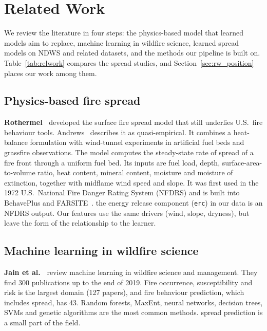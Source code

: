 
\section{Related Work}
\label{sec:related}

We review the literature in four steps: the physics-based model that learned models aim to replace,
machine learning in wildfire science, learned spread models on NDWS and related datasets, and the methods
our pipeline is built on. Table~\ref{tab:relwork} compares the spread studies, and
Section~\ref{sec:rw_position} places our work among them.

\subsection{Physics-based fire spread}

\textbf{Rothermel~\cite{rothermel1972}} developed the surface fire spread model that still underlies U.S.\
fire behaviour tools. Andrews~\cite{andrews2018} describes it as quasi-empirical. It combines a heat-balance
formulation with wind-tunnel experiments in artificial fuel beds and grassfire observations. The model
computes the steady-state rate of spread of a fire front through a uniform fuel bed. Its inputs are fuel
load, depth, surface-area-to-volume ratio, heat content, mineral content, moisture and moisture of
extinction, together with midflame wind speed and slope. It was first used in the 1972 U.S.\ National
Fire Danger Rating System (NFDRS) and is built into BehavePlus and FARSITE~\cite{andrews2018}.
\relevance{} the energy release component (\texttt{erc}) in our data is an NFDRS output. Our features
use the same drivers (wind, slope, dryness), but leave the form of the relationship to the learner.

\subsection{Machine learning in wildfire science}

\textbf{Jain et al.~\cite{jain2020}} review machine learning in wildfire science and management. They find
300 publications up to the end of 2019. Fire occurrence, susceptibility and risk is the largest domain
(127 papers), and fire behaviour prediction, which includes spread, has 43. Random forests, MaxEnt,
neural networks, decision trees, SVMs and genetic algorithms are the most common methods.
\relevance{} spread prediction is a small part of the field.

